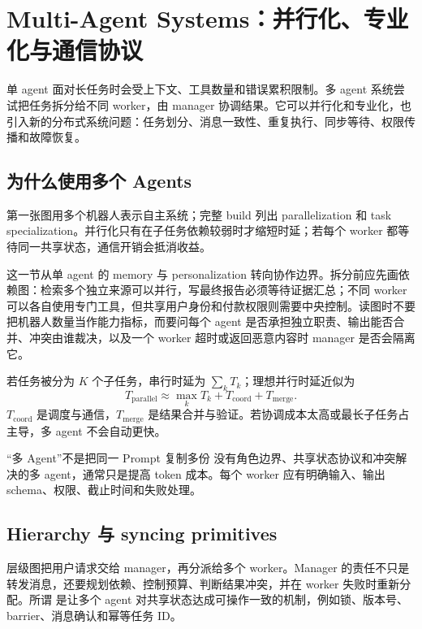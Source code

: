 \section{Multi-Agent Systems：并行化、专业化与通信协议}

单 agent 面对长任务时会受上下文、工具数量和错误累积限制。多 agent 系统尝试把任务拆分给不同 worker，由 manager 协调结果。它可以并行化和专业化，也引入新的分布式系统问题：任务划分、消息一致性、重复执行、同步等待、权限传播和故障恢复。

\subsection{为什么使用多个 Agents}

第一张图用多个机器人表示自主系统；完整 build 列出 parallelization 和 task specialization。并行化只有在子任务依赖较弱时才缩短时延；若每个 worker 都等待同一共享状态，通信开销会抵消收益。

这一节从单 agent 的 memory 与 personalization 转向协作边界。拆分前应先画依赖图：检索多个独立来源可以并行，写最终报告必须等待证据汇总；不同 worker 可以各自使用专门工具，但共享用户身份和付款权限则需要中央控制。读图时不要把机器人数量当作能力指标，而要问每个 agent 是否承担独立职责、输出能否合并、冲突由谁裁决，以及一个 worker 超时或返回恶意内容时 manager 是否会隔离它。



若任务被分为 $K$ 个子任务，串行时延为 $\sum_k T_k$；理想并行时延近似为
\[
T_{\text{parallel}}\approx \max_k T_k+T_{\text{coord}}+T_{\text{merge}}.
\]
$T_{\text{coord}}$ 是调度与通信，$T_{\text{merge}}$ 是结果合并与验证。若协调成本太高或最长子任务占主导，多 agent 不会自动更快。

\begin{warningbox}{“多 Agent”不是把同一 Prompt 复制多份}
没有角色边界、共享状态协议和冲突解决的多 agent，通常只是提高 token 成本。每个 worker 应有明确输入、输出 schema、权限、截止时间和失败处理。
\end{warningbox}

\subsection{Hierarchy 与 syncing primitives}

层级图把用户请求交给 manager，再分派给多个 worker。Manager 的责任不只是转发消息，还要规划依赖、控制预算、判断结果冲突，并在 worker 失败时重新分配。所谓  是让多个 agent 对共享状态达成可操作一致的机制，例如锁、版本号、barrier、消息确认和幂等任务 ID。

